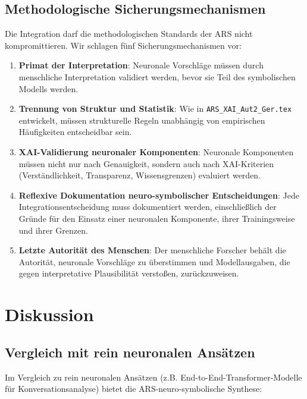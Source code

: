 \documentclass[12pt,a4paper]{article}
\begin{document}
\subsection{Methodologische Sicherungsmechanismen}

Die Integration darf die methodologischen Standards der ARS nicht kompromittieren. 
Wir schlagen fünf Sicherungsmechanismen vor:

\begin{enumerate}
    \item \textbf{Primat der Interpretation}: Neuronale Vorschläge müssen durch 
    menschliche Interpretation validiert werden, bevor sie Teil des symbolischen 
    Modells werden.
    
    \item \textbf{Trennung von Struktur und Statistik}: Wie in 
    \texttt{ARS\_XAI\_Aut2\_Ger.tex} entwickelt, müssen strukturelle Regeln 
    unabhängig von empirischen Häufigkeiten entscheidbar sein.
    
    \item \textbf{XAI-Validierung neuronaler Komponenten}: Neuronale Komponenten 
    müssen nicht nur nach Genauigkeit, sondern auch nach XAI-Kriterien (Verständlichkeit, 
    Transparenz, Wissensgrenzen) evaluiert werden.
    
    \item \textbf{Reflexive Dokumentation neuro-symbolischer Entscheidungen}: 
    Jede Integrationsentscheidung muss dokumentiert werden, einschließlich der 
    Gründe für den Einsatz einer neuronalen Komponente, ihrer Trainingsweise 
    und ihrer Grenzen.
    
    \item \textbf{Letzte Autorität des Menschen}: Der menschliche Forscher behält 
    die Autorität, neuronale Vorschläge zu überstimmen und Modellausgaben, die 
    gegen interpretative Plausibilität verstoßen, zurückzuweisen.
\end{enumerate}

\section{Diskussion}

\subsection{Vergleich mit rein neuronalen Ansätzen}

Im Vergleich zu rein neuronalen Ansätzen (z.B. End-to-End-Transformer-Modelle 
für Konversationsanalyse) bietet die ARS-neuro-symbolische Synthese:
\end{document}
